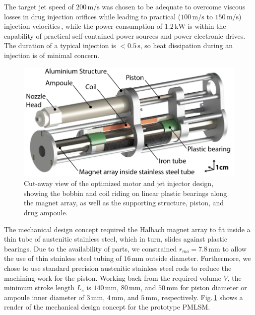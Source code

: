     
    The target jet speed of $200\,\mathrm{m/s}$ was chosen to be adequate to overcome viscous losses in drug injection orifices while leading to practical ($100\,\mathrm{m/s}$ to $150\,\mathrm{m/s}$) injection velocities\,\cite{mitragotri2006}, while the power consumption of $1.2\,\mathrm{kW}$ is within the capability of practical self-contained power sources and power electronic drives. The duration of a typical injection is $<0.5\,\mathrm{s}$, so heat dissipation during an injection is of minimal concern.


    \begin{figure}[h]
      \centering
      \includegraphics[width=5in]{chap5/images/PMLSM_render.pdf}
      \caption{Cut-away view of the optimized motor and jet injector design, showing the bobbin and coil riding on linear plastic bearings along the magnet array, as well as the supporting structure, piston, and drug ampoule.}
      \label{fig:chap/experiment/PMLSM render}
    \end{figure}


    The mechanical design concept required the Halbach magnet array to fit inside a thin tube of austenitic stainless steel, which in turn, slides against plastic bearings. Due to the availability of parts, we constrained $r_{mo}=7.8\,\mathrm{mm}$ to allow the use of thin stainless steel tubing of $16\,\mathrm{mm}$ outside diameter. Furthermore, we chose to use standard precision austenitic stainless steel rods to reduce the machining work for the piston. Working back from the required volume $V$, the minimum stroke length $L_s$ is $140\,\mathrm{mm}$, $80\,\mathrm{mm}$, and $50\,\mathrm{mm}$ for piston diameter or ampoule inner diameter of $3\,\mathrm{mm}$, $4\,\mathrm{mm}$, and $5\,\mathrm{mm}$, respectively. Fig.\,\ref{fig:chap/experiment/PMLSM render} shows a render of the mechanical design concept for the prototype \acs{PMLSM}. 
    


